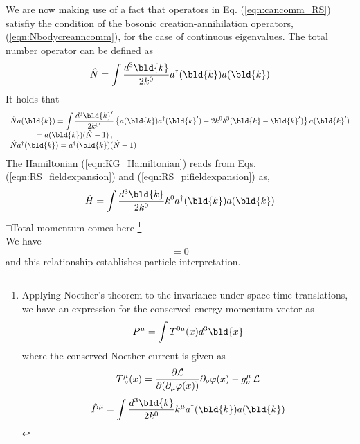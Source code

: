 We are now making use of a fact that operators in Eq. (\ref{eqn:cancomm_RS}) satisfiy
the condition of the bosonic creation-annihilation operators, (\ref{eqn:Nbodycreanncomm}), 
for the case of continuous eigenvalues.
The total number operator can be defined as
\begin{equation}
\hat{N} = \int \frac{d^3 \bld{k}}{2k^0} a^\dagger(\bld{k}) a(\bld{k})
\label{eqn:KG_totalNumberOp}
\end{equation}
It holds that
\begin{equation}
\begin{array}{l}
\displaystyle
\hat{N} a(\bld{k}) = 
\int \frac{d^3 \bld{k}'}{2k^{0'}} \left\{
a(\bld{k}) a^\dagger(\bld{k}') - 2 k^0 \delta^3(\bld{k} - \bld{k}') \right\} a(\bld{k}')\\
\hspace{12mm} 
= a(\bld{k}) (\hat{N} - 1)\,,
\\
\hat{N} a^\dagger(\bld{k}) 
= a^\dagger(\bld{k}) (\hat{N} + 1)
\end{array}
\end{equation}
The Hamiltonian (\ref{eqn:KG_Hamiltonian}) reads from 
Eqs. (\ref{eqn:RS_fieldexpansion}) and (\ref{eqn:RS_pifieldexpansion}) as,
\begin{equation}
\hat{H} = \int \frac{d^3 \bld{k}}{2k^0} k^0 a^\dagger(\bld{k}) a(\bld{k})
\label{eqn:KG_Hamiltonian_aadagg}
\end{equation}
□Total momentum comes here
\footnote{
Applying  Noether's theorem to the invariance under space-time translations,
we have an expression for the conserved energy-momentum vector as
\begin{equation*}
P^\mu = \int T^{0 \mu} (x) d^3 \bld{x}
\end{equation*}
where the conserved Noether current is given as
\begin{equation*}
T^{\mu}_{\;\nu} (x) =
\frac{\partial {\cal L}}{\partial (\partial_\mu \varphi(x))}
\partial_\nu \varphi(x) 
- g^\mu_\nu \,{\cal L}
\end{equation*}
\begin{equation*}
\hat{P}^\mu =  \int \frac{d^3 \bld{k}}{2k^0} k^\mu a^\dagger(\bld{k}) a(\bld{k})
\end{equation*}
} %
\\
We have
\begin{equation}
[ \hat{P}^\mu, \hat{N}] = 0
\label{eqn:commutingHandN}
\end{equation}
and this relationship establishes particle interpretation.
